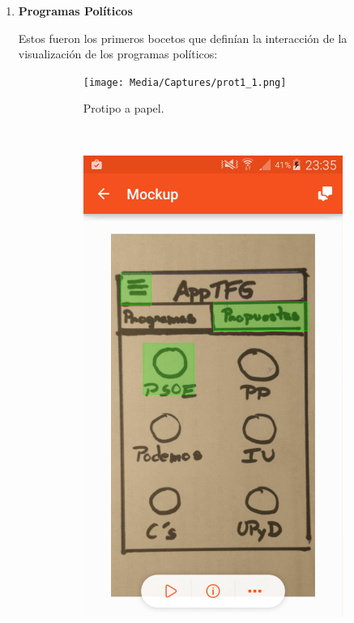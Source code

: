\begin{enumerate}
 \item \textbf{Programas Políticos}
 
 Estos fueron los primeros bocetos que definían la interacción de la visualización de los programas políticos:
 
 	\begin{figure}[H]
        \centering
        \begin{subfigure}[b]{0.3\textwidth}
                \texttt{[image: Media/Captures/prot1\_1.png]}
                \caption{Protipo a papel.}
                \label{fig:quipDesktop}
        \end{subfigure}
        ~
        \begin{subfigure}[b]{0.3\textwidth}
                \includegraphics[width=\textwidth]{Media/Captures/prot1_2.png}

\end{subfigure}
\end{figure}
\end{enumerate}

